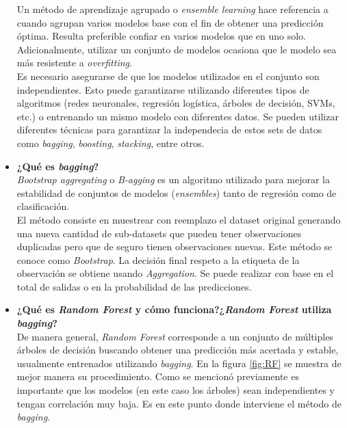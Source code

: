\begin{itemize}
    Un método de aprendizaje agrupado o \textit{ensemble learning} hace referencia a cuando agrupan varios modelos base con el fin de obtener una predicción óptima. Resulta preferible confiar en varios modelos que en uno solo. Adicionalmente, utilizar un conjunto de modelos ocasiona que le modelo sea más resistente a \textit{overfitting}.\\
    Es necesario asegurarse de que los modelos utilizados en el conjunto son independientes. Esto puede garantizarse utilizando diferentes tipos de algoritmos (redes neuronales, regresión logística, árboles de decisión, SVMs, etc.) o entrenando un mismo modelo con diferentes datos. Se pueden utilizar diferentes técnicas para garantizar la independecia de estos sets de datos como \textit{bagging}, \textit{boosting}, \textit{stacking}, entre otros.  
    
    \item \textbf{¿Qué es \textit{bagging}?}\\
    
    \textit{Bootstrap aggregating} o \textit{B-agging} es un algoritmo utilizado para mejorar la estabilidad de conjuntos de modelos (\textit{ensembles}) tanto de regresión como de clasificación.\\
    El método consiste en muestrear con reemplazo el dataset original generando una nueva cantidad de sub-datasets que pueden tener observaciones duplicadas pero que de seguro tienen observaciones nuevas. Este método se conoce como \textit{Bootstrap}. La decisión final respeto a la etiqueta de la observación se obtiene usando \textit{Aggregation}. Se puede realizar con base en el total de salidas o en la probabilidad de las predicciones.
    
    \item \textbf{¿Qué es \textit{Random Forest} y cómo funciona?¿\textit{Random Forest} utiliza \textit{bagging}?}\\
    
    De manera general, \textit{Random Forest} corresponde a un conjunto de múltiples árboles de decisión buscando obtener una predicción más acertada y estable, usualmente entrenados utilizando \textit{bagging}. En la figura \ref{fig:RF} se muestra de mejor manera su procedimiento. Como se mencionó previamente es importante que los modelos (en este caso los árboles) sean independientes y tengan correlación muy baja. Es en este punto donde interviene el método de \textit{bagging}.\\
    

\end{itemize}
